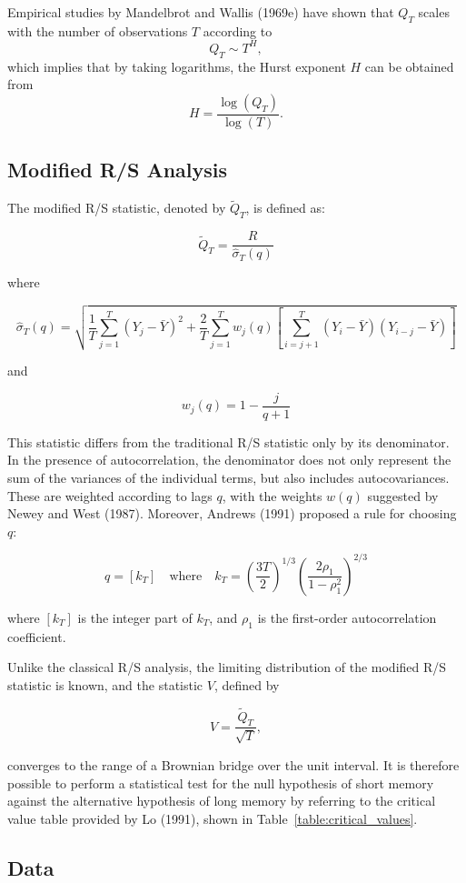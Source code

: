 \documentclass[11pt]{extarticle}
\begin{document}
Empirical studies by Mandelbrot and Wallis (1969e) have shown that \( Q_T \) scales with the number of observations \( T \) according to
\[
Q_T \sim T^H,
\]
which implies that by taking logarithms, the Hurst exponent \( H \) can be obtained from
\[
H = \frac{\log(Q_T)}{\log(T)}.
\]


\subsection{Modified R/S Analysis}
The modified R/S statistic, denoted by $\tilde{Q}_T$, is defined as:

\[
\tilde{Q}_T = \frac{R}{\hat{\sigma}_T(q)}
\]

where

\[
\hat{\sigma}_T(q) = \sqrt{\frac{1}{T} \sum_{j=1}^{T} (Y_j - \bar{Y})^2 + \frac{2}{T} \sum_{j=1}^{T} w_j(q) \left[ \sum_{i=j+1}^{T} (Y_i - \bar{Y})(Y_{i-j} - \bar{Y}) \right]}
\]

and

\[
w_j(q) = 1 - \frac{j}{q + 1}
\]

This statistic differs from the traditional R/S statistic only by its denominator. In the presence of autocorrelation,
the denominator does not only represent the sum of the variances of the individual terms, but also includes autocovariances.
These are weighted according to lags $q$, with the weights $w(q)$ suggested by Newey and West (1987). Moreover, Andrews
(1991) proposed a rule for choosing $q$:

\[
q = \left[ k_T \right] \quad \text{where} \quad k_T = \left( \frac{3T}{2} \right)^{1/3} \left( \frac{2 \rho_1}{1 - \rho_1^2} \right)^{2/3}
\]

where $[k_T]$ is the integer part of $k_T$, and $\rho_1$ is the first-order autocorrelation coefficient.

Unlike the classical R/S analysis, the limiting distribution of the modified R/S statistic is known, and the statistic $V$, defined by

\[
V = \frac{\tilde{Q}_T}{\sqrt{T}},
\]

converges to the range of a Brownian bridge over the unit interval. It is therefore possible to perform a statistical
test for the null hypothesis of short memory against the alternative hypothesis of long memory by referring to the
critical value table provided by Lo (1991), shown in Table~\ref{table:critical_values}.

\subsection{Data}
\end{document}
